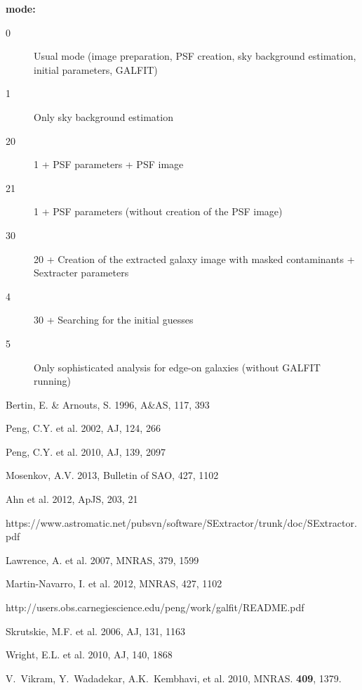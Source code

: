 \documentclass[
aps,%
12pt,%
final,%
notitlepage,%
oneside,%
onecolumn,%
nobibnotes,%
nofootinbib,%
superscriptaddress,%
noshowpacs,%
centertags]%
{revtex4}
\begin{document}
\centerline{\textbf{mode:}}
\begin{description}
\item[0] Usual mode (image preparation, PSF creation, sky background estimation, initial parameters, GALFIT)
\item[1]	Only sky background estimation
\item[20]	1 + PSF parameters + PSF image 
\item[21]	1 + PSF parameters (without creation of  the PSF image)
\item[30]	20 + Creation of the extracted galaxy image with masked contaminants + Sextracter parameters
\item[4]	30 + Searching for the initial guesses
\item[5]	Only sophisticated analysis for edge-on galaxies (without GALFIT running)
\end{description}


\pagebreak
\begin{thebibliography}{99}

 Bertin, E. \& Arnouts, S. 1996, A\&AS, 117, 393

 Peng, C.Y. et al. 2002, AJ, 124, 266

 Peng, C.Y. et al. 2010, AJ, 139, 2097

 Mosenkov, A.V. 2013, Bulletin of SAO, 427, 1102 

 Ahn et al. 2012, ApJS, 203, 21

 https://www.astromatic.net/pubsvn/software/SExtractor/trunk/doc/SExtractor.pdf

 Lawrence, A. et al. 2007, MNRAS, 379, 1599

 Martin-Navarro, I. et al. 2012, MNRAS, 427, 1102

 http://users.obs.carnegiescience.edu/peng/work/galfit/README.pdf
 

 Skrutskie, M.F. et al. 2006, AJ, 131, 1163
 
 Wright, E.L. et al. 2010, AJ, 140, 1868 

V.~Vikram, Y.~Wadadekar, A.K.~Kembhavi, et al. 2010, MNRAS. \textbf{409}, 1379.

 
\end{thebibliography}
\end{document}
